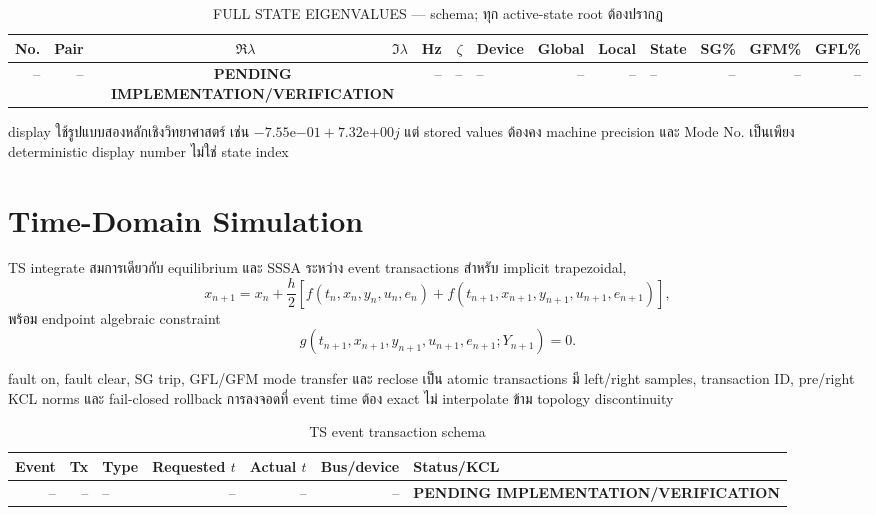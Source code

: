 \documentclass[12pt,a4paper]{article}
\newcommand{\pending}{\textcolor{red!75!black}{\textbf{PENDING IMPLEMENTATION/VERIFICATION}}}
\begin{document}
\begin{table}[H]\centering\scriptsize
\caption{FULL STATE EIGENVALUES --- schema; ทุก active-state root ต้องปรากฏ}
\begin{tabularx}{\textwidth}{rrr r r r l r r l r r r}
\toprule
No. & Pair & $\Re\lambda$ & $\Im\lambda$ & Hz & $\zeta$ & Device & Global & Local & State & SG\% & GFM\% & GFL\% \\\midrule
-- & -- & \multicolumn{2}{c}{\pending} & -- & -- & -- & -- & -- & -- & -- & -- & -- \\
\bottomrule
\end{tabularx}
\end{table}

display ใช้รูปแบบสองหลักเชิงวิทยาศาสตร์ เช่น
$-7.55\mathrm{e}{-01}+7.32\mathrm{e}{+00}j$ แต่ stored values ต้องคง machine precision
และ Mode No. เป็นเพียง deterministic display number ไม่ใช่ state index

\section{Time-Domain Simulation}

TS integrate สมการเดียวกับ equilibrium และ SSSA ระหว่าง event transactions
สำหรับ implicit trapezoidal,
\begin{equation}
x_{n+1}=x_n+\frac{h}{2}
\left[f(t_n,x_n,y_n,u_n,e_n)+f(t_{n+1},x_{n+1},y_{n+1},u_{n+1},e_{n+1})\right],
\end{equation}
พร้อม endpoint algebraic constraint
\begin{equation}
g(t_{n+1},x_{n+1},y_{n+1},u_{n+1},e_{n+1};Y_{n+1})=0.
\end{equation}

fault on, fault clear, SG trip, GFL/GFM mode transfer และ reclose เป็น atomic
transactions มี left/right samples, transaction ID, pre/right KCL norms และ fail-closed
rollback การลงจอดที่ event time ต้อง exact ไม่ interpolate ข้าม topology discontinuity

\begin{table}[H]\centering\small
\caption{TS event transaction schema}
\begin{tabularx}{\textwidth}{rrlrrrX}
\toprule
Event & Tx & Type & Requested $t$ & Actual $t$ & Bus/device & Status/KCL \\\midrule
-- & -- & -- & -- & -- & -- & \pending \\
\bottomrule
\end{tabularx}
\end{table}
\end{document}
